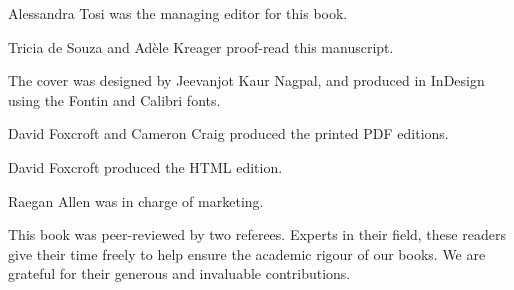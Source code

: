 \documentclass[
  a4paper,
]{book}
\begin{document}

Alessandra Tosi was the managing editor for this book.

Tricia de Souza and Adèle Kreager proof-read this manuscript.

The cover was designed by Jeevanjot Kaur Nagpal, and produced in
InDesign using the Fontin and Calibri fonts.

David Foxcroft and Cameron Craig produced the printed PDF editions.

David Foxcroft produced the HTML edition.

Raegan Allen was in charge of marketing.

This book was peer-reviewed by two referees. Experts in their field,
these readers give their time freely to help ensure the academic rigour
of our books. We are grateful for their generous and invaluable
contributions.


\backmatter
\end{document}
